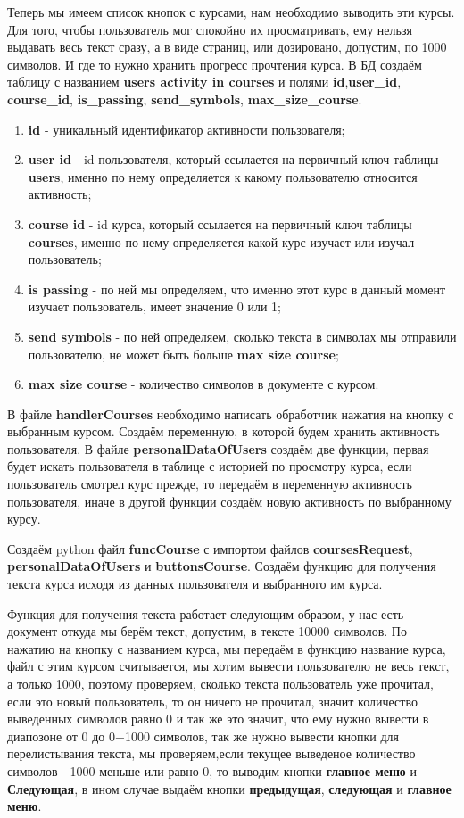 \documentclass[12pt, oldlfont, amsfonts]{report}
\begin{document}
Теперь мы имеем список кнопок с курсами, нам необходимо выводить эти курсы. Для того, чтобы пользователь мог спокойно их просматривать, ему нельзя выдавать весь текст сразу, а в виде страниц, или дозировано, допустим, по 1000 символов. И где то нужно хранить прогресс прочтения курса. В БД создаём таблицу с названием {\bf users activity in courses} и полями {\bf id},{\bf user\_id}, {\bf course\_id}, {\bf is\_passing}, {\bf send\_symbols}, {\bf max\_size\_course}.
\begin{enumerate}
\item {\bf id} - уникальный идентификатор активности пользователя;
\item {\bf user id} - id пользователя, который ссылается на первичный ключ таблицы {\bf users}, именно по нему определяется к какому пользователю относится активность;
\item {\bf course id} - id курса, который ссылается на первичный ключ таблицы {\bf courses}, именно по нему определяется какой курс изучает или изучал пользователь;
\item {\bf is passing} - по ней мы определяем, что именно этот курс в данный момент изучает пользователь, имеет значение 0 или 1;
\item {\bf send symbols} - по ней определяем, сколько текста в символах мы отправили пользователю, не может быть больше {\bf max size course};
\item {\bf max size course} - количество символов в документе с курсом.
\end{enumerate}	
В файле {\bf handlerCourses} необходимо написать обработчик нажатия на кнопку с выбранным курсом. Создаём переменную, в которой будем хранить активность пользователя. В файле {\bf personalDataOfUsers} создаём две функции, первая будет искать пользователя в таблице с историей по просмотру курса, если пользователь смотрел курс прежде, то передаём в переменную активность пользователя, иначе в другой функции создаём новую активность по выбранному курсу. 

Создаём python файл {\bf funcCourse} с импортом файлов {\bf coursesRequest}, {\bf personalDataOfUsers} и {\bf buttonsCourse}.
Создаём функцию для получения текста курса исходя из данных пользователя и выбранного им курса.

Функция для получения текста работает следующим образом, у нас есть документ откуда мы берём текст, допустим, в тексте 10000 символов. По нажатию на кнопку с названием курса, мы передаём в функцию название курса, файл с этим курсом считывается, мы хотим вывести пользователю не весь текст, а только 1000, поэтому проверяем, сколько текста пользователь уже прочитал, если это новый пользователь, то он ничего не прочитал, значит количество выведенных символов равно 0 и так же это значит, что ему нужно вывести в диапозоне от 0 до 0+1000 символов, так же нужно вывести кнопки для перелистывания текста, мы проверяем,если текущее выведеное количество символов - 1000 меньше или равно 0, то выводим кнопки {\bf главное меню} и {\bf Следующая}, в ином случае выдаём кнопки {\bf предыдущая}, {\bf следующая} и {\bf главное меню}.
\end{document}

